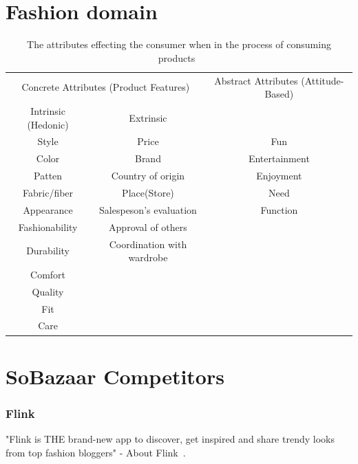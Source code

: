 \section{Fashion domain}

\begin{table}[H]
    \centering
    \begin{tabular}{ccc}
    \toprule
      \multicolumn{2}{c}{Concrete Attributes (Product Features)} & Abstract Attributes (Attitude-Based) \\
      \cmidrule(r{1em}){1-2}
      \multicolumn{1}{c}{Intrinsic (Hedonic)} & \multicolumn{1}{c}{Extrinsic} 				 	& \\ \midrule
      Style 				& Price						 	& Fun \\
      Color				& Brand 					 	& Entertainment \\
      Patten 				& Country of origin			 	& Enjoyment\\
      Fabric/fiber 		& Place(Store) 				 	& Need \\
      Appearance	   	 	& Salespeson's evaluation	 	&  Function\\
      Fashionability  	& Approval of others 		 	&\\
      Durability			& Coordination with wardrobe 	&\\
      Comfort				&								& \\
      Quality				&								& \\
      Fit					&								& \\
      Care 				&								& \\
    \bottomrule
    \end{tabular}
    \caption[Consumers' Purchase Decisions]{The attributes effecting the consumer when in the process of consuming products~\cite{dutton2006}}
    \label{table:ConsumersPurchaseDec}
\end{table}

\section{SoBazaar Competitors}\label{app:sec:soCompetitors}
\subsubsection{Flink} %
\label{par:flink}
    "Flink is THE brand-new app to discover, get inspired and share trendy looks from top fashion bloggers" - About Flink~\cite{flink}.

